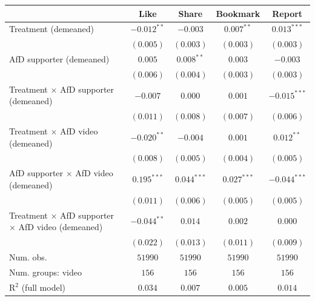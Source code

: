 
\begin{table}
\begin{center}
\begin{tabular}{l c c c c}
\hline
 & Like & Share & Bookmark & Report \\
\hline
Treatment (demeaned)                             & $-0.012^{**}$ & $-0.003$      & $0.007^{**}$  & $0.013^{***}$  \\
                                                 & $(0.005)$     & $(0.003)$     & $(0.003)$     & $(0.003)$      \\
AfD supporter (demeaned)                         & $0.005$       & $0.008^{**}$  & $0.003$       & $-0.003$       \\
                                                 & $(0.006)$     & $(0.004)$     & $(0.003)$     & $(0.003)$      \\
Treatment × AfD supporter (demeaned)             & $-0.007$      & $0.000$       & $0.001$       & $-0.015^{***}$ \\
                                                 & $(0.011)$     & $(0.008)$     & $(0.007)$     & $(0.006)$      \\
Treatment × AfD video (demeaned)                 & $-0.020^{**}$ & $-0.004$      & $0.001$       & $0.012^{**}$   \\
                                                 & $(0.008)$     & $(0.005)$     & $(0.004)$     & $(0.005)$      \\
AfD supporter × AfD video (demeaned)             & $0.195^{***}$ & $0.044^{***}$ & $0.027^{***}$ & $-0.044^{***}$ \\
                                                 & $(0.011)$     & $(0.006)$     & $(0.005)$     & $(0.005)$      \\
Treatment × AfD supporter × AfD video (demeaned) & $-0.044^{**}$ & $0.014$       & $0.002$       & $0.000$        \\
                                                 & $(0.022)$     & $(0.013)$     & $(0.011)$     & $(0.009)$      \\
\hline
Num. obs.                                        & $51990$       & $51990$       & $51990$       & $51990$        \\
Num. groups: video                               & $156$         & $156$         & $156$         & $156$          \\
R$^2$ (full model)                               & $0.034$       & $0.007$       & $0.005$       & $0.014$        \\

\end{tabular}
\end{center}
\end{table}
